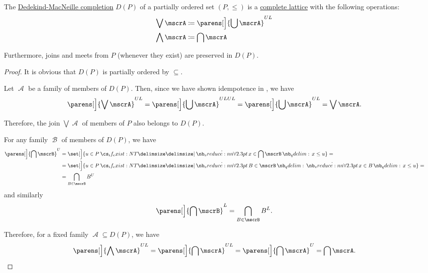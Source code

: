 \begin{theorem}\label{thm:def:dedekind_macnielle_completion}
  The \hyperref[def:dedekind_macnielle_completion]{Dedekind-MacNeille completion} \( D(P) \) of a partially ordered set \( (P, \leq) \) is a \hyperref[def:lattice]{complete lattice} with the following operations:
  \begin{align*}
    \bigvee \mscrA   &\coloneqq \parens[\Big]{ \bigcup \mscrA }^{UL} \\
    \bigwedge \mscrA &\coloneqq \bigcap \mscrA
  \end{align*}

  Furthermore, joins and meets from \( P \) (whenever they exist) are preserved in \( D(P) \).
\end{theorem}
\begin{proof}
  It is obvious that \( D(P) \) is partially ordered by \( \subseteq \).

   Let \( \mscrA \) be a family of members of \( D(P) \). Then, since we have shown idempotence in , we have
  \begin{equation*}
    \parens[\Big]{ \bigvee \mscrA }^{UL}
    =
    \parens[\Big]{ \bigcup \mscrA }^{ULUL}
    =
    \parens[\Big]{ \bigcup \mscrA }^{UL}
    =
    \bigvee \mscrA.
  \end{equation*}

  Therefore, the join \( \bigvee \mscrA \) of members of \( P \) also belongs to \( D(P) \).

   For any family \( \mscrB \) of members of \( D(P) \), we have
  \begin{align*}
    \parens[\Big]{ \bigcap \mscrB }^U
    &=
    \set[\Big]{ u \in P \given* \qforall {x \in \bigcap \mscrB} x \leq u }
    = \\ &=
    \set[\Big]{ u \in P \given* \qforall {B \in \mscrB} \qforall {x \in B} x \leq u }
    = \\ &=
    \bigcap_{B \in \mscrB} B^U
  \end{align*}
  and similarly
  \begin{equation*}
    \parens[\Big]{ \bigcap \mscrB }^L
    =
    \bigcap_{B \in \mscrB} B^L.
  \end{equation*}

  Therefore, for a fixed family \( \mscrA \subseteq D(P) \), we have
  \begin{equation*}
    \parens[\Big]{ \bigwedge \mscrA }^{UL}
    =
    \parens[\Big]{ \bigcap \mscrA }^{UL}
    =
    \parens[\Big]{ \bigcap \mscrA }^U
    =
    \bigcap \mscrA.
  \end{equation*}


\end{proof}
